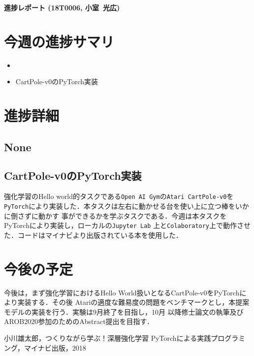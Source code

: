 \documentclass[11pt,a4paper]{jsarticle}
\def\stdid{18T0006}		%
\def\sirname{小室}		%
\def\firstname{光広}		%
\begin{document}

\noindent
\textbf{\large 進捗レポート (\stdid, \sirname\ \firstname)}		%

\section*{今週の進捗サマリ}			%

\begin{itemize}
\item 
\item CartPole-v0のPyTorch実装
\end{itemize}

\section{進捗詳細}					%
\subsection{None}
\subsection{CartPole-v0のPyTorch実装}
強化学習のHello world的タスクである\texttt{Open AI Gym}の\texttt{Atari CartPole-v0}を
\texttt{PyTorch}により実装した．本タスクは左右に動かせる台を使い上に立つ棒をいかに倒さずに動かす
事ができるかを学ぶタスクである．今週は本タスクをPyTorchにより実装し，ローカルの\texttt{Jupyter Lab}
上と\texttt{Colaboratory}上で動作させた．コードはマイナビより出版されている本\cite{book1}を使用した．


\section{今後の予定}
今後は，まず強化学習におけるHello World扱いとなるCartPole-v0をPyTorchにより実装する．その後
Atariの適度な難易度の問題をベンチマークとし，本提案モデルの実装を行う．実験は9月終了を目指し，10月
以降修士論文の執筆及びAROB2020参加のためのAbstract提出を目指す．

\begin{thebibliography}{1}
   小川雄太郎，つくりながら学ぶ！深層強化学習 PyTorchによる実践プログラミング，マイナビ出版，2018
\end{thebibliography}
\end{document}
